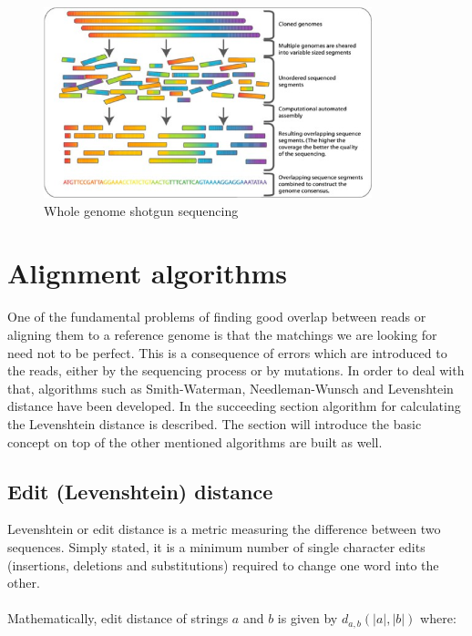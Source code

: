\documentclass[times, utf8, diplomski]{fer}
\begin{document}
\begin{figure}[!ht]
\begin{center}
	\includegraphics[width=0.85\textwidth]{../img/Whole_genome_shotgun_sequencing.png}
	\caption{Whole genome shotgun sequencing\cite{shotgun.sequencing.img}}\label{shotgun.sequencing}
\end{center}
\end{figure}

\section{Alignment algorithms}

One of the fundamental problems of finding good overlap between reads or aligning them to a reference genome is that the matchings we are looking for need not to be perfect. This is a consequence of errors which are introduced to the reads, either by the sequencing process or by mutations. In order to deal with that, algorithms such as Smith-Waterman\cite{Smith1981195}, Needleman-Wunsch\cite{nw}  and Levenshtein distance\cite{edit.distance.tutorial} have been developed. In the succeeding section algorithm for calculating the Levenshtein distance is described. The section will introduce the basic concept on top of the other mentioned algorithms are built as well.

\subsection{Edit (Levenshtein) distance}

Levenshtein or edit distance is a metric measuring the difference between two sequences. Simply stated, it is a minimum number of single character edits (insertions, deletions and substitutions) required to change one word into the other.
\\
\\
Mathematically, edit distance of strings $a$ and $b$ is given by $d_{a,b}(|a|,|b|)$ where:
\end{document}
